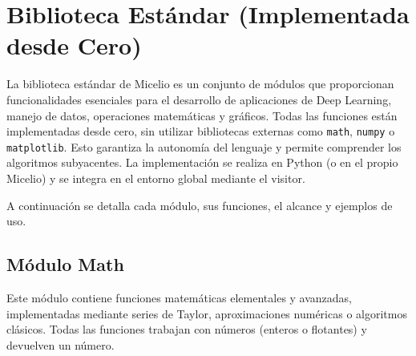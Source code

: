 \documentclass[12pt]{article}
\begin{document}
\section{Biblioteca Estándar (Implementada desde Cero)}

La biblioteca estándar de Micelio es un conjunto de módulos que proporcionan funcionalidades esenciales para el desarrollo de aplicaciones de Deep Learning, manejo de datos, operaciones matemáticas y gráficos. Todas las funciones están implementadas desde cero, sin utilizar bibliotecas externas como \texttt{math}, \texttt{numpy} o \texttt{matplotlib}. Esto garantiza la autonomía del lenguaje y permite comprender los algoritmos subyacentes. La implementación se realiza en Python (o en el propio Micelio) y se integra en el entorno global mediante el visitor.

A continuación se detalla cada módulo, sus funciones, el alcance y ejemplos de uso.

\subsection{Módulo Math}

Este módulo contiene funciones matemáticas elementales y avanzadas, implementadas mediante series de Taylor, aproximaciones numéricas o algoritmos clásicos. Todas las funciones trabajan con números (enteros o flotantes) y devuelven un número.
\end{document}
